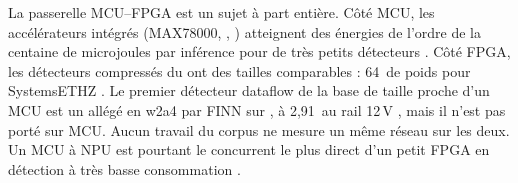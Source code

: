 La passerelle MCU--FPGA est un sujet à part entière. Côté MCU, les accélérateurs intégrés
(MAX78000, , ) atteignent des énergies de l'ordre de la centaine de
microjoules par inférence pour de très petits détecteurs
\citep[§III]{arxiv-2306.00001-tinyissimoyolo-quantized-low-memory-footprint}. Côté FPGA,
les détecteurs compressés du  ont des tailles comparables : 64\, de poids pour
SystemsETHZ \citep[§4.2]{2021-xu-dac-sdc-low-power-object}. Le premier détecteur dataflow
de la base de taille proche d'un MCU est un  allégé en w2a4 par FINN sur , à 2,91\, au rail 12\,V
\citep[§V-VI]{arxiv-2609.24757-npu-accelerator-quantized-real-time}\pp, mais il n'est pas
porté sur MCU. Aucun travail du corpus ne mesure un même réseau sur les deux. Un MCU à NPU
est pourtant le concurrent le plus direct d'un petit FPGA en détection à très basse consommation \deduit.
